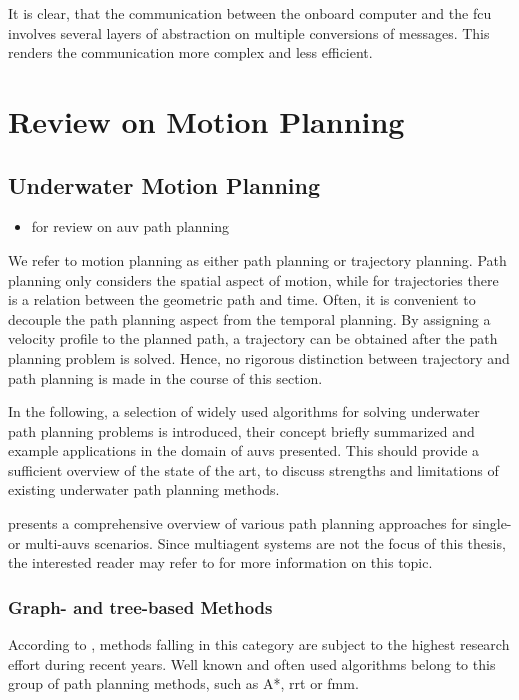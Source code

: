 It is clear, that the communication between the onboard computer and the \ac{fcu} involves several layers of abstraction on multiple conversions of messages. This renders the communication more complex and less efficient. 
%


\section{Review on Motion Planning}
\label{sec:review-motion-planning}
\subsection{Underwater Motion Planning}
\begin{itemize}
    \color{red}
    \item \cite{Panda20} for review on auv path planning
\end{itemize}
\label{sec:underwater-motion-planning}
We refer to motion planning as either path planning or trajectory planning. Path planning only considers the spatial aspect of motion, while for trajectories there is a relation between the geometric path and time. Often, it is convenient to decouple the path planning aspect from the temporal planning. By assigning a velocity profile to the planned path, a trajectory can be obtained after the path planning problem is solved. Hence, no rigorous distinction between trajectory and path planning is made in the course of this section.

In the following, a selection of widely used algorithms for solving underwater path planning problems is introduced, their concept briefly summarized and example applications in the domain of \acp{auv} presented. This should provide a sufficient overview of the state of the art, to discuss strengths and limitations of existing underwater path planning methods.

\cite{Panda20} presents a comprehensive overview of various path planning approaches for single- or multi-\acsp{auv} scenarios. Since multiagent systems are not the focus of this thesis, the interested reader may refer to \cite{Panda20} for more information on this topic.


\subsubsection{Graph- and tree-based Methods}
According to \cite{Gomez15}, methods falling in this category are subject to the highest research effort during recent years. Well known and often used algorithms belong to this group of path planning methods, such as A*, \ac{rrt} or \ac{fmm}.


